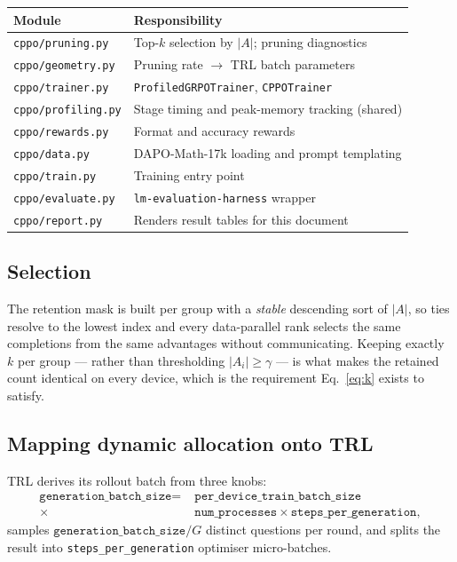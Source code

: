 \documentclass[11pt,a4paper]{article}
\newcommand{\Adv}{A}
\begin{document}
\begin{center}
\begin{tabular}{ll}
\toprule
Module & Responsibility \\
\midrule
\texttt{cppo/pruning.py}   & Top-$k$ selection by $|\Adv|$; pruning diagnostics \\
\texttt{cppo/geometry.py}  & Pruning rate $\rightarrow$ TRL batch parameters \\
\texttt{cppo/trainer.py}   & \texttt{ProfiledGRPOTrainer}, \texttt{CPPOTrainer} \\
\texttt{cppo/profiling.py} & Stage timing and peak-memory tracking (shared) \\
\texttt{cppo/rewards.py}   & Format and accuracy rewards \\
\texttt{cppo/data.py}      & DAPO-Math-17k loading and prompt templating \\
\texttt{cppo/train.py}     & Training entry point \\
\texttt{cppo/evaluate.py}  & \texttt{lm-evaluation-harness} wrapper \\
\texttt{cppo/report.py}    & Renders result tables for this document \\
\bottomrule
\end{tabular}
\end{center}

\subsection{Selection}

The retention mask is built per group with a \emph{stable} descending sort of
$|\Adv|$, so ties resolve to the lowest index and every data-parallel rank
selects the same completions from the same advantages without communicating.
Keeping exactly $k$ per group --- rather than thresholding $|\Adv_i| \ge
\gamma$ --- is what makes the retained count identical on every device, which
is the requirement Eq.~\eqref{eq:k} exists to satisfy.

\subsection{Mapping dynamic allocation onto TRL}
\label{sec:geometry}

TRL derives its rollout batch from three knobs:
\[
\begin{aligned}
\texttt{generation\_batch\_size} = \;&\texttt{per\_device\_train\_batch\_size}\\
\times\;&\texttt{num\_processes} \times \texttt{steps\_per\_generation},
\end{aligned}
\]
samples $\texttt{generation\_batch\_size} / G$ distinct questions per round,
and splits the result into \texttt{steps\_per\_generation} optimiser
micro-batches.
\end{document}
